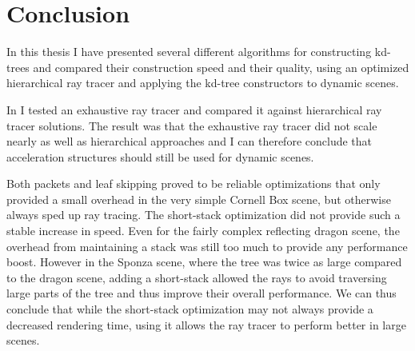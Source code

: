 




\chapter{Conclusion}



In this thesis I have presented several different algorithms for constructing
kd-trees and compared their construction speed and their quality, using an
optimized hierarchical ray tracer and applying the kd-tree constructors to
dynamic scenes.



In  I tested an exhaustive ray tracer and compared it
against hierarchical ray tracer solutions. The result was that the exhaustive
ray tracer did not scale nearly as well as hierarchical approaches and I can
therefore conclude that acceleration structures should still be used for dynamic
scenes.


Both packets and leaf skipping proved to be reliable optimizations that only
provided a small overhead in the very simple Cornell Box scene, but otherwise
always sped up ray tracing. The short-stack optimization did not provide such a
stable increase in speed. Even for the fairly complex reflecting dragon scene,
the overhead from maintaining a stack was still too much to provide any
performance boost. However in the Sponza scene, where the tree was twice as
large compared to the dragon scene, adding a short-stack allowed the rays to
avoid traversing large parts of the tree and thus improve their overall
performance. We can thus conclude that while the short-stack optimization may
not always provide a decreased rendering time, using it allows the ray tracer to
perform better in large scenes.


